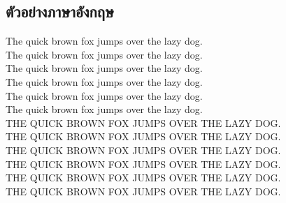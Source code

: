 \documentclass[twocolumn,a4paper]{article}
\begin{document}
\subsection{ตัวอย่างภาษาอังกฤษ}
The quick brown fox jumps over the lazy dog.\\
The quick brown fox jumps over the lazy dog.\\
The quick brown fox jumps over the lazy dog.\\
The quick brown fox jumps over the lazy dog.\\
The quick brown fox jumps over the lazy dog.\\
The quick brown fox jumps over the lazy dog.\\
\MakeUppercase{The quick brown fox jumps over the lazy dog.}\\
\MakeUppercase{The quick brown fox jumps over the lazy dog.}\\
\MakeUppercase{The quick brown fox jumps over the lazy dog.}\\
\MakeUppercase{The quick brown fox jumps over the lazy dog.}\\
\MakeUppercase{The quick brown fox jumps over the lazy dog.}\\
\MakeUppercase{The quick brown fox jumps over the lazy dog.}\\
\end{document}
